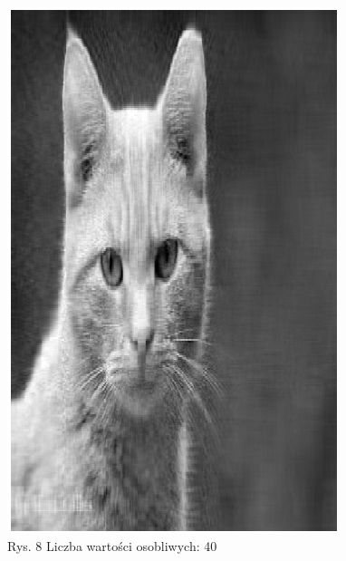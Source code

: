 \documentclass{article}
\begin{document}
\begin{figure}[!htb]
\begin{minipage}{0.48\textwidth}
          \includegraphics[width=.8\linewidth]{40.png}
          \caption*{Rys. 8 Liczba wartości osobliwych: 40}
        \end{minipage}
     \end{figure}
\end{document}
